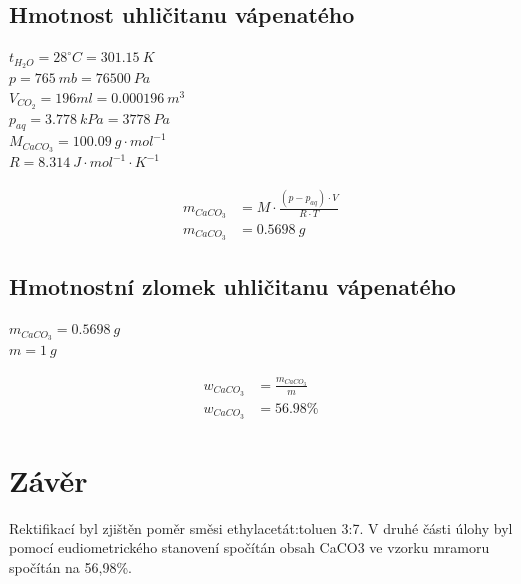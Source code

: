 \documentclass[13pt, a4paper, twoside]{article}
\begin{document}
\subsection*{Hmotnost uhličitanu vápenatého}
$t_{H_2O}=28^{\circ}C = 301.15\: K$\\
$p = 765\: mb = 76500\:Pa$\\
$V_{CO_2}=196ml = 0.000196\:m^3$\\
$p_{aq}=3.778\:kPa=3778\:Pa$\\
$M_{CaCO_3} = 100.09 \: g\cdot mol^{-1}$\\
$R = 8.314\: J\cdot mol^{-1}\cdot K^{-1}$

\begin{align*}
    m_{CaCO_3} &= M\cdot\frac{(p-p_{aq})\cdot V}{R\cdot T}\\
    m_{CaCO_3} &= 0.5698 \: g
\end{align*}

\subsection*{Hmotnostní zlomek uhličitanu vápenatého}
$m_{CaCO_3}=0.5698\:g$\\
$m = 1\: g$

\begin{align*}
    w_{CaCO_3} &= \frac{m_{CaCO_3}}{m}\\
    w_{CaCO_3} &= 56.98\%
\end{align*}

\section*{Závěr}
Rektifikací byl zjištěn poměr směsi ethylacetát:toluen 3:7. V druhé části úlohy byl pomocí eudiometrického stanovení spočítán obsah CaCO3 ve vzorku mramoru spočítán na 56,98\%.
\end{document}

